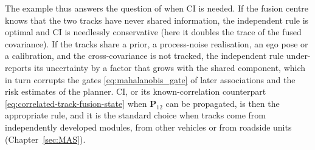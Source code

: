 \begin{example}
The example thus answers the question of when CI is needed. If the fusion centre knows that the two tracks have never shared information, the independent rule is optimal and CI is needlessly conservative (here it doubles the trace of the fused covariance). If the tracks share a prior, a process-noise realisation, an ego pose or a calibration, and the cross-covariance is not tracked, the independent rule under-reports its uncertainty by a factor that grows with the shared component, which in turn corrupts the gates \eqref{eq:mahalanobis_gate} of later associations and the risk estimates of the planner. CI, or its known-correlation counterpart \eqref{eq:correlated-track-fusion-state} when $\mathbf{P}_{12}$ can be propagated, is then the appropriate rule, and it is the standard choice when tracks come from independently developed modules, from other vehicles or from roadside units (Chapter~\ref{sec:MAS}).
\end{example}


